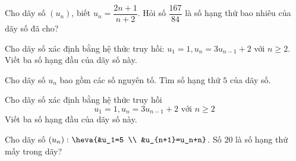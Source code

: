 \begin{bt}%
    Cho dãy số $(u_n)$, biết $u_n=\dfrac{2n+1}{n+2}$. Hỏi số $\dfrac{167}{84}$ là số hạng thứ bao nhiêu của dãy số đã cho?
\end{bt}

\begin{bt}%
	Cho dãy số xác định bằng hệ thức truy hồi: $u_1=1, u_n=3u_{n-1}+2$ với $n\ge 2$. Viết ba số hạng đầu của dãy số này.
\end{bt}

\begin{bt}%

	Cho dãy số $u_n$ bao gồm các số nguyên tố. Tìm số hạng thứ $5$ của dãy số.
\end{bt}

\begin{bt}%
	Cho dãy số xác định bằng hệ thức truy hồi
	$$
	u_1=1, u_n=3 u_{n-1}+2 \text { với } n \geq 2
	$$
	Viết ba số hạng đầu của dãy số này.
\end{bt}

\begin{bt}%

	Cho dãy số $\left(u_n\right)\colon\heva{&u_1=5 \\ &u_{n+1}=u_n+n}$. Số $20$ là số hạng thứ mấy trong dãy?
\end{bt}

